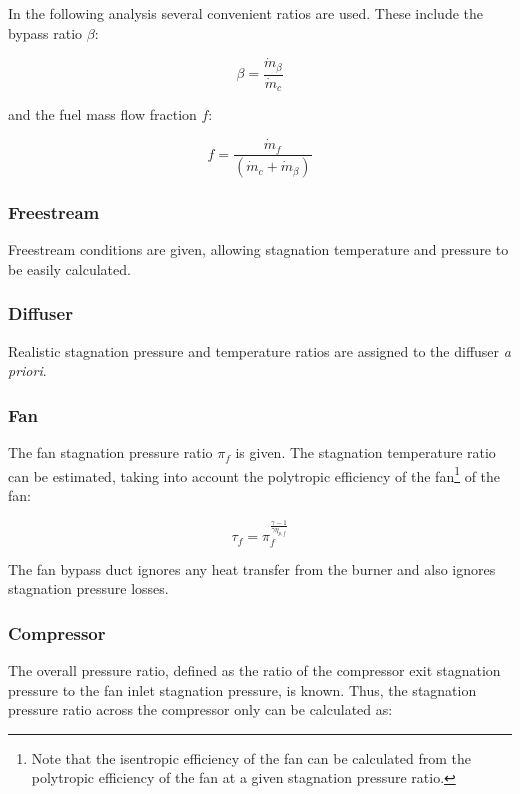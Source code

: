 \documentclass{article}
\begin{document}
In the following analysis several convenient ratios are used. These include the bypass ratio $\beta$:

\begin{equation*}
\beta = \frac{\dot{m}_{\beta}}{\dot{m}_c}
\end{equation*}

and the fuel mass flow fraction $f$:

\begin{equation*}
f = \frac{\dot{m}_f}{\left( \dot{m}_c + \dot{m}_{\beta} \right)}
\end{equation*}

\subsubsection{Freestream}
Freestream conditions are given, allowing stagnation temperature and pressure to be easily calculated.

\subsubsection{Diffuser}
Realistic stagnation pressure and temperature ratios are assigned to the diffuser \textit{a priori}.

\subsubsection{Fan}
The fan stagnation pressure ratio $\pi_f$ is given. The stagnation temperature ratio can be estimated, taking into account the polytropic efficiency of the fan\footnote{Note that the isentropic efficiency of the fan can be calculated from the polytropic efficiency of the fan at a given stagnation pressure ratio.} of the fan:

\begin{equation*}
\tau_f = \pi_f^{\frac{\gamma-1}{\gamma \eta_{p,f}}}
\end{equation*}

The fan bypass duct ignores any heat transfer from the burner and also ignores stagnation pressure losses.

\subsubsection{Compressor}
The overall pressure ratio, defined as the ratio of the compressor exit stagnation pressure to the fan inlet stagnation pressure, is known. Thus, the stagnation pressure ratio across the compressor only can be calculated as:
\end{document}
